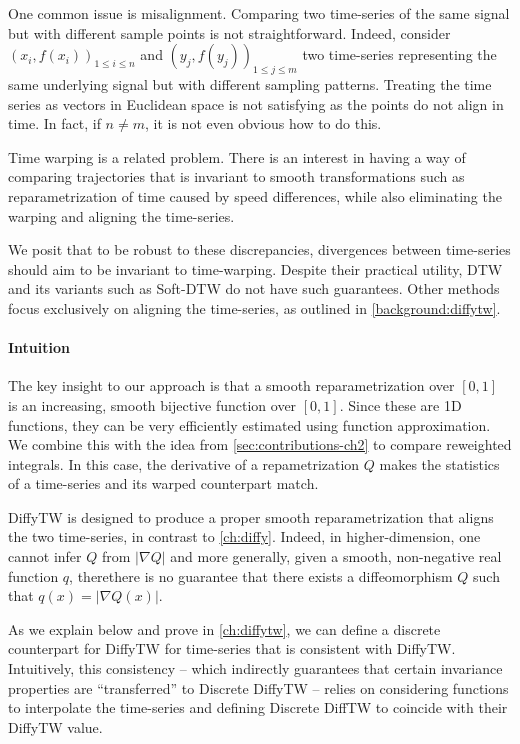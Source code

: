 One common issue is misalignment. Comparing two time-series of the same signal but with different sample points is not straightforward. Indeed, consider $(x_i, f(x_i))_{1\leq i\leq n}$ and $(y_j, f(y_j))_{1 \leq j \leq m}$ two time-series representing the same underlying signal but with different sampling patterns. Treating the time series as vectors in Euclidean space is not satisfying as the points do not align in time. In fact, if $n\neq m$, it is not even obvious how to do this.

Time warping is a related problem. There is an interest in having a way of comparing trajectories that is invariant to smooth transformations such as reparametrization of time caused by speed differences, while also eliminating the warping and aligning the time-series.

We posit that to be robust to these discrepancies, divergences between time-series should aim to be invariant to time-warping. Despite their practical utility, DTW \citep{dtw} and its variants such as Soft-DTW \citep{soft-dtw} do not have such guarantees. Other methods focus exclusively on aligning the time-series, as outlined in \cref{background:diffytw}.

\paragraph{Intuition}
The key insight to our approach is that a smooth reparametrization over $[0,1]$ is an increasing, smooth bijective function over $[0,1]$. Since these are 1D functions, they can be very efficiently estimated using function approximation. We combine this with the idea from \cref{sec:contributions-ch2} to compare reweighted integrals. In this case, the derivative of a repametrization $Q$ makes the statistics of a time-series and its warped counterpart match.

DiffyTW is designed to produce a proper smooth reparametrization that aligns the two time-series, in contrast to \cref{ch:diffy}. Indeed, in higher-dimension, one cannot infer $Q$ from $\vert \nabla Q\vert$ and more generally, given a smooth, non-negative real function $q$, therethere is no guarantee that there exists a diffeomorphism $Q$ such that $q(x) = \vert \nabla Q(x) \vert$.

As we explain below and prove in \cref{ch:diffytw}, we can define a discrete counterpart for DiffyTW for time-series that is consistent with DiffyTW. Intuitively, this consistency -- which indirectly guarantees that certain invariance properties are ``transferred'' to Discrete DiffyTW -- relies on considering functions to interpolate the time-series and defining Discrete DiffTW to coincide with their DiffyTW value.


